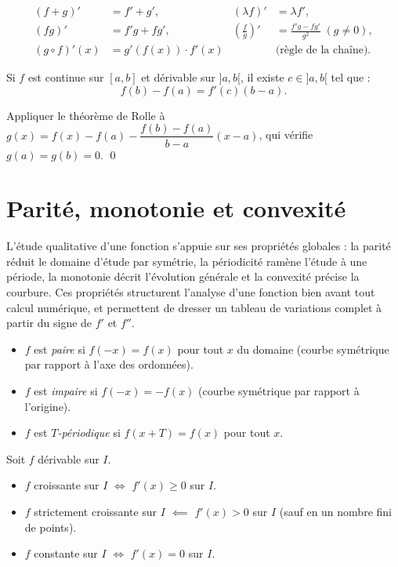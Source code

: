 \documentclass[11pt,a4paper,twoside]{book}
\begin{document}
\begin{theoremebox}
\begin{align*}
  (f+g)' &= f'+g', & (\lambda f)' &= \lambda f', \\
  (fg)' &= f'g+fg', & \left(\frac{f}{g}\right)' &= \frac{f'g-fg'}{g^2}\;(g\neq0), \\
  (g\circ f)'(x) &= g'(f(x))\cdot f'(x) & &\text{(règle de la chaîne)}.
\end{align*}
\end{theoremebox}

\begin{theoremebox}
Si $f$ est continue sur $[a,b]$ et dérivable sur $]a,b[$, il existe $c \in ]a,b[$ tel que :
\[
  f(b)-f(a) = f'(c)(b-a).
\]
\end{theoremebox}

\begin{preuvebox}
Appliquer le théorème de Rolle à $g(x) = f(x) - f(a) - \dfrac{f(b)-f(a)}{b-a}(x-a)$,
qui vérifie $g(a)=g(b)=0$. \qed
\end{preuvebox}

\section{Parité, monotonie et convexité}

L'étude qualitative d'une fonction s'appuie sur ses propriétés globales : la parité réduit le domaine d'étude par symétrie, la périodicité ramène l'étude à une période, la monotonie décrit l'évolution générale et la convexité précise la courbure. Ces propriétés structurent l'analyse d'une fonction bien avant tout calcul numérique, et permettent de dresser un tableau de variations complet à partir du signe de $f'$ et $f''$.

\begin{definitionbox}
\begin{itemize}
  \item $f$ est \emph{paire} si $f(-x) = f(x)$ pour tout $x$ du domaine (courbe symétrique par rapport à l'axe des ordonnées).
  \item $f$ est \emph{impaire} si $f(-x) = -f(x)$ (courbe symétrique par rapport à l'origine).
  \item $f$ est \emph{$T$-périodique} si $f(x+T) = f(x)$ pour tout $x$.
\end{itemize}
\end{definitionbox}

\begin{theoremebox}
Soit $f$ dérivable sur $I$.
\begin{itemize}
  \item $f$ croissante sur $I$ $\iff$ $f'(x) \geq 0$ sur $I$.
  \item $f$ strictement croissante sur $I$ $\impliedby$ $f'(x) > 0$ sur $I$ (sauf en un nombre fini de points).
  \item $f$ constante sur $I$ $\iff$ $f'(x) = 0$ sur $I$.
\end{itemize}
\end{theoremebox}
\end{document}
